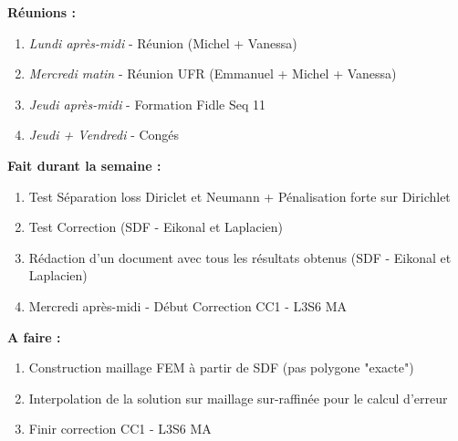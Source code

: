 \textbf{Réunions :}
\begin{enumerate}[label=\textbullet]
	\item \textit{Lundi après-midi} - Réunion (Michel + Vanessa)
	\item \textit{Mercredi matin} - Réunion UFR (Emmanuel + Michel + Vanessa)
	\item \textit{Jeudi après-midi} - Formation Fidle Seq 11
	\item \textit{Jeudi + Vendredi} - Congés
\end{enumerate}
\textbf{Fait durant la semaine :}
\begin{enumerate}[label=\textbullet]
	\item Test Séparation loss Diriclet et Neumann + Pénalisation forte sur Dirichlet
	\item Test Correction (SDF - Eikonal et Laplacien)
	\item Rédaction d'un document avec tous les résultats obtenus (SDF - Eikonal et Laplacien)
	\item Mercredi après-midi - Début Correction CC1 - L3S6 MA
\end{enumerate}
\textbf{A faire :}
\begin{enumerate}[label=\textbullet]
	\item Construction maillage FEM à partir de SDF (pas polygone "exacte")
	\item Interpolation de la solution sur maillage sur-raffinée pour le calcul d'erreur
	\item Finir correction CC1 - L3S6 MA
\end{enumerate}